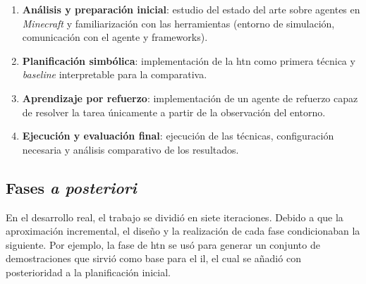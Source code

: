 \begin{enumerate}
  \item \textbf{Análisis y preparación inicial}: estudio del estado del arte
        sobre agentes en \textit{Minecraft} y familiarización con las herramientas
        (entorno de simulación, comunicación con el agente y
        {\glspl{framework}}).
  \item \textbf{Planificación simbólica}: implementación de la
        \gls{htn} como primera técnica y \textit{baseline} interpretable
        para la comparativa.
  \item \textbf{Aprendizaje por refuerzo}: implementación de un agente de
        refuerzo capaz de resolver la tarea únicamente a partir de la
        observación del entorno.
  \item \textbf{Ejecución y evaluación final}: ejecución de las técnicas,
        configuración necesaria y análisis comparativo de los resultados.
\end{enumerate}

\subsection{Fases \textit{a posteriori}}
En el desarrollo real, el trabajo se dividió en siete iteraciones. Debido a que la aproximación
incremental, el diseño y la realización de cada fase condicionaban la siguiente. Por ejemplo,
la fase de \gls{htn} se usó para generar un conjunto de demostraciones 
que sirvió como base para el \gls{il}, el cual se añadió con posterioridad a la planificación inicial.

